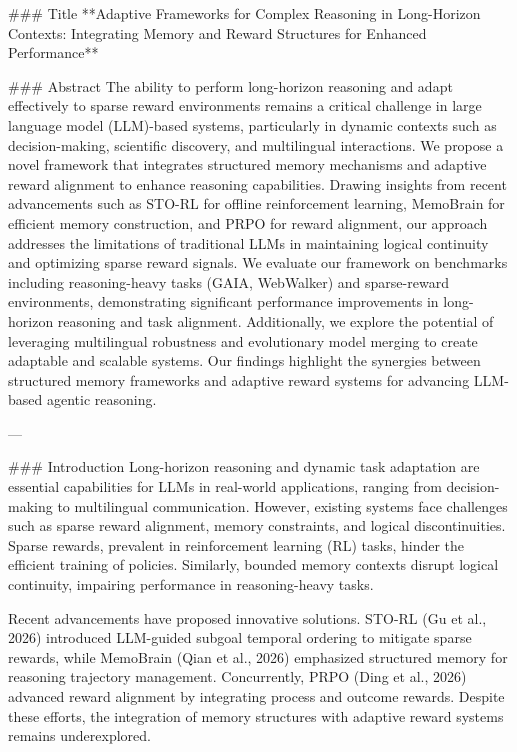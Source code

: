 ### Title
**Adaptive Frameworks for Complex Reasoning in Long-Horizon Contexts: Integrating Memory and Reward Structures for Enhanced Performance**

### Abstract
The ability to perform long-horizon reasoning and adapt effectively to sparse reward environments remains a critical challenge in large language model (LLM)-based systems, particularly in dynamic contexts such as decision-making, scientific discovery, and multilingual interactions. We propose a novel framework that integrates structured memory mechanisms and adaptive reward alignment to enhance reasoning capabilities. Drawing insights from recent advancements such as STO-RL for offline reinforcement learning, MemoBrain for efficient memory construction, and PRPO for reward alignment, our approach addresses the limitations of traditional LLMs in maintaining logical continuity and optimizing sparse reward signals. We evaluate our framework on benchmarks including reasoning-heavy tasks (GAIA, WebWalker) and sparse-reward environments, demonstrating significant performance improvements in long-horizon reasoning and task alignment. Additionally, we explore the potential of leveraging multilingual robustness and evolutionary model merging to create adaptable and scalable systems. Our findings highlight the synergies between structured memory frameworks and adaptive reward systems for advancing LLM-based agentic reasoning.

---

### Introduction
Long-horizon reasoning and dynamic task adaptation are essential capabilities for LLMs in real-world applications, ranging from decision-making to multilingual communication. However, existing systems face challenges such as sparse reward alignment, memory constraints, and logical discontinuities. Sparse rewards, prevalent in reinforcement learning (RL) tasks, hinder the efficient training of policies. Similarly, bounded memory contexts disrupt logical continuity, impairing performance in reasoning-heavy tasks.

Recent advancements have proposed innovative solutions. STO-RL (Gu et al., 2026) introduced LLM-guided subgoal temporal ordering to mitigate sparse rewards, while MemoBrain (Qian et al., 2026) emphasized structured memory for reasoning trajectory management. Concurrently, PRPO (Ding et al., 2026) advanced reward alignment by integrating process and outcome rewards. Despite these efforts, the integration of memory structures with adaptive reward systems remains underexplored.

